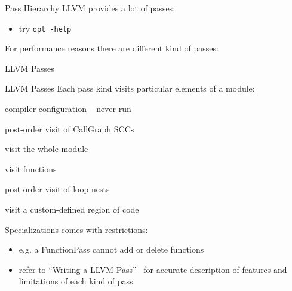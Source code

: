 \documentclass[10pt,mathserif]{beamer}
\begin{document}
\begin{frame}{Pass Hierarchy}
LLVM provides a lot of passes:

\begin{itemize}
\item try \texttt{\smaller opt -help}
\end{itemize}

\vfill
For performance reasons there are different kind of passes:

\begin{block}{LLVM Passes}

\centering
\end{block}
\end{frame}

\begin{frame}{LLVM Passes}
Each pass kind visits particular elements of a module:

\begin{description}[align=left, labelwidth=1cm]
\item[ImmutablePass] compiler configuration -- never run
\item[CallGraphSCCPass] post-order visit of CallGraph SCCs
\item[ModulePass] visit the whole module
\item[FunctionPass] visit functions
\item[LoopPass] post-order visit of loop nests
\item[RegionPass] visit a custom-defined region of code
\end{description}

\vfill
Specializations comes with restrictions:

\begin{itemize}
\item e.g. a \alert{FunctionPass} cannot add or delete functions
\item refer to ``Writing a LLVM Pass''~\cite{LOCAL:www/llvmWritingAPass}
      for accurate description of features and limitations of each kind of pass
\end{itemize}
\end{frame}

%
%
%
%
\end{document}
